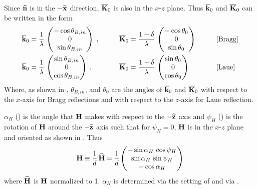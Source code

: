 Since ${\widehat{\bf n}}$ is in the $-{\widehat{\bf x}}$ direction, $\overline{{\bf K}}_0$ is also in the $x$-$z$ plane. Thus
$\overline{{\bf k}}_0$ and $\overline{{\bf K}}_0$ can be written in the form
\begin{alignat}{3}
  \overline{{\bf k}}_0 &= \frac{1}{\lambda} \, 
    \begin{pmatrix}
    -\cos\theta_{B,in} \\
    0 \\
    \sin\theta_{B,in}
    \end{pmatrix}
  \; , & \qquad
  \overline{{\bf K}}_0 &= \frac{1 - \delta}{\lambda} \, 
    \begin{pmatrix}
    -\cos\theta_0 \\
    0 \\
    \sin\theta_0
    \end{pmatrix}
  & \qquad &\text{[Bragg]} \nonumber \\
  \overline{{\bf k}}_0 &= \frac{1}{\lambda} \, 
    \begin{pmatrix}
    \sin\theta_{B,in} \\
    0 \\
    \cos\theta_{B,in}
    \end{pmatrix}
  \; , & \qquad
  \overline{{\bf K}}_0 &= \frac{1 - \delta}{\lambda} \, 
    \begin{pmatrix}
    \sin\theta_0 \\
    0 \\
    \cos\theta_0
    \end{pmatrix}
  &\qquad & \text{[Laue]} 
  \label{k1lst}
\end{alignat}
Where, as shown in , $\theta_{B,in}$, and
$\theta_0$ are the angles of $\overline{{\bf k}}_0$ and $\overline{{\bf K}}_0$ with respect
to the $x$-axis for Bragg reflections and with respect to the $z$-axis
for Laue reflection. 

$\alpha_H$ () is the angle that ${\bf H}$ makes with
respect to the $-{\widehat{\bf z}}$ axis and $\psi_H$ () is the
rotation of ${\bf H}$ around the $-{\widehat{\bf z}}$ axis such that for $\psi_H =
0$, ${\bf H}$ is in the $x$-$z$ plane and oriented as shown in
. Thus
\begin{equation}
  {\bf H} 
  \equiv \frac{1}{d} \, {\widehat{\bf H}} 
  = \frac{1}{d}
    \begin{pmatrix} 
       -\sin \alpha_H \, \cos \psi_H \\ \sin \alpha_H \, \sin \psi_H \\ -\cos \alpha_H
    \end{pmatrix}
  \label{h1daa}
\end{equation}
where ${\widehat{\bf H}}$ is ${\bf H}$ normalized to 1. $\alpha_H$ is determined
via the setting of  and via .

